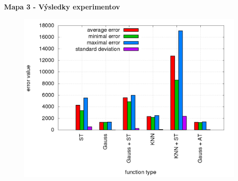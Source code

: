 \documentclass[xcolor=dvipsnames]{beamer}
\begin{document}
\begin{frame}{\bf Mapa 3 - Výsledky experimentov}

\begin{figure}[!htb]
\centering
\includegraphics[scale=.36]{../../results_q_learning/map_3/trials_average_results.png}
\end{figure}

\end{frame}
\end{document}

